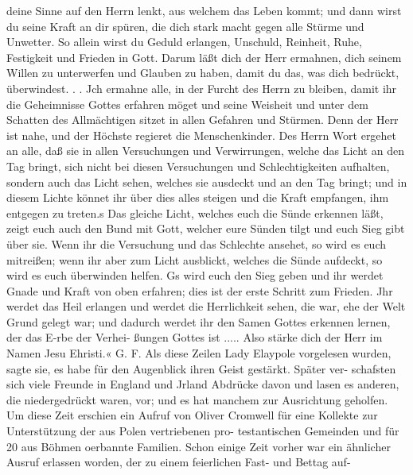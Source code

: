 deine Sinne auf den Herrn lenkt, aus welchem das Leben
kommt; und dann wirst du seine Kraft an dir spüren, die dich
stark macht gegen alle Stürme und Unwetter. So allein wirst
du Geduld erlangen, Unschuld, Reinheit, Ruhe, Festigkeit und
Frieden in Gott. Darum läßt dich der Herr ermahnen, dich
seinem Willen zu unterwerfen und Glauben zu haben, damit du
das, was dich bedrückt, überwindest. .   . Jch ermahne alle,
in der Furcht des Herrn zu bleiben, damit ihr die Geheimnisse
Gottes erfahren möget und seine Weisheit und unter dem Schatten
des Allmächtigen sitzet in allen Gefahren und Stürmen. Denn
der Herr ist nahe, und der Höchste regieret die Menschenkinder.
Des Herrn Wort ergehet an alle, daß sie in allen Versuchungen
und Verwirrungen, welche das Licht an den Tag bringt, sich nicht
bei diesen Versuchungen und Schlechtigkeiten aufhalten, sondern
auch das Licht sehen, welches sie ausdeckt und an den Tag
bringt; und in diesem Lichte könnet ihr über dies alles steigen
und die Kraft empfangen, ihm entgegen zu treten.s Das gleiche
Licht, welches euch die Sünde erkennen läßt, zeigt euch auch den
Bund mit Gott, welcher eure Sünden tilgt und euch Sieg gibt
über sie.   Wenn ihr die Versuchung und das Schlechte ansehet,
so wird es euch mitreißen; wenn ihr aber zum Licht ausblickt,
welches die Sünde aufdeckt, so wird es euch überwinden helfen.
Gs wird euch den Sieg geben und ihr werdet Gnade und Kraft
von oben erfahren; dies ist der erste Schritt zum Frieden. Jhr
werdet das Heil erlangen und werdet die Herrlichkeit sehen, die
war, ehe der Welt Grund gelegt war; und dadurch werdet ihr
den Samen Gottes erkennen lernen, der das E-rbe der Verhei-
ßungen Gottes ist ..... Also stärke dich der Herr im Namen
Jesu Ehristi.« G. F.
Als diese Zeilen Lady Elaypole vorgelesen wurden, sagte sie,
es habe für den Augenblick ihren Geist gestärkt. Später ver-
schafsten sich viele Freunde in England und Jrland Abdrücke
davon und lasen es anderen, die niedergedrückt waren, vor; und
es hat manchem zur Ausrichtung geholfen.
Um diese Zeit erschien ein Aufruf von Oliver Cromwell für
eine Kollekte zur Unterstützung der aus Polen vertriebenen pro-
testantischen Gemeinden und für 20 aus Böhmen oerbannte
Familien. Schon einige Zeit vorher war ein ähnlicher Ausruf
erlassen worden, der zu einem feierlichen Fast- und Bettag auf-


